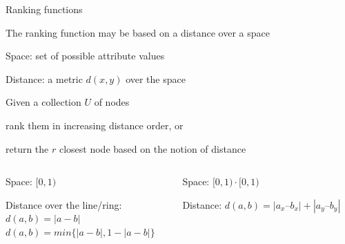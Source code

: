 \begin{frame}{Ranking functions}
	
\BIL
\item The ranking function may be based on a distance over a space
\BI
\item \alert{Space}: set of possible attribute values
\item \alert{Distance}: a metric $d(x,y)$ over the space 
\EI
\item Given a collection $U$ of nodes
\BI
\item rank them in increasing distance order, or
\item return the $r$ closest node based on the notion of distance
\EI
\EIL

\begin{columns}
\begin{column}{0.50\textwidth}
\begin{example}
\BI
\item Space: $[0, 1)$
\item Distance over the line/ring:\\ 
  $d(a,b) = | a-b |$\\
  $d(a,b) = min \{ | a-b | , 1-|a-b| \}$
\EI
\end{example}
\end{column}
\begin{column}{0.45\textwidth}
\begin{example}
\BI
\item Space: $[0, 1) \cdot [0, 1)$
\item Distance: $d(a,b) = | a_x – b_x | + | a_y – b_y |$
\EI
\end{example}
\end{column}
\end{columns}
\end{frame}

